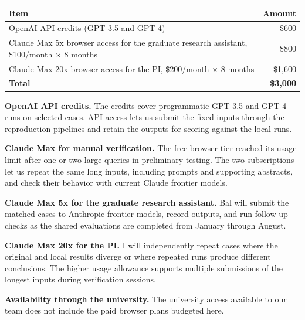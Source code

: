 \documentclass[11pt]{article}
\begin{document}
\begin{table}[h]
\centering\small
\begin{tabularx}{\textwidth}{@{}Xr@{}}
\toprule
Item & Amount \\
\midrule
OpenAI API credits (GPT-3.5 and GPT-4) & \$600 \\
Claude Max 5x browser access for the graduate research assistant, \$100/month $\times$ 8 months & \$800 \\
Claude Max 20x browser access for the PI, \$200/month $\times$ 8 months & \$1,600 \\
\midrule
\textbf{Total} & \textbf{\$3,000} \\
\bottomrule
\end{tabularx}
\end{table}

\textbf{OpenAI API credits.} The credits cover programmatic GPT-3.5 and GPT-4 runs on selected cases. API access lets us submit the fixed inputs through the reproduction pipelines and retain the outputs for scoring against the local runs.

\textbf{Claude Max for manual verification.} The free browser tier reached its usage limit after one or two large queries in preliminary testing. The two subscriptions let us repeat the same long inputs, including prompts and supporting abstracts, and check their behavior with current Claude frontier models.

\textbf{Claude Max 5x for the graduate research assistant.} Bal will submit the matched cases to Anthropic frontier models, record outputs, and run follow-up checks as the shared evaluations are completed from January through August.

\textbf{Claude Max 20x for the PI.} I will independently repeat cases where the original and local results diverge or where repeated runs produce different conclusions. The higher usage allowance supports multiple submissions of the longest inputs during verification sessions.

\textbf{Availability through the university.} The university access available to our team does not include the paid browser plans budgeted here.
\end{document}
